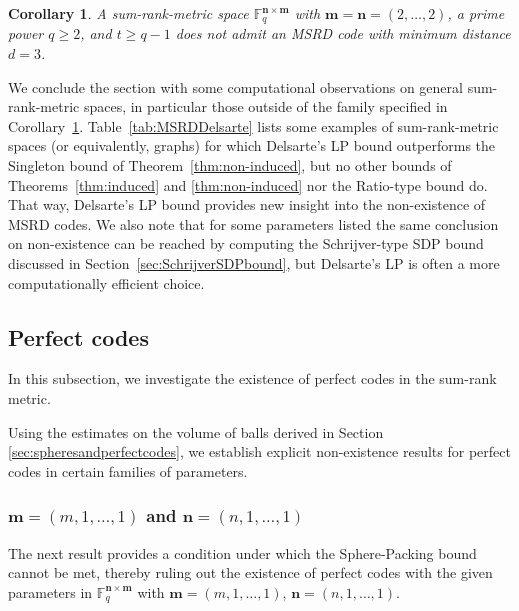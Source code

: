 \documentclass[a4paper]{article}
\newtheorem{corollary}[formula]{Corollary}
\newcommand{\F}{\mathbb{F}}
\newcommand{\bfn}{\mathbf {n}}
\newcommand{\bfm}{\mathbf {m}}
\newcommand{\spac}{\F^{\bfn\times\bfm}_q}
\begin{document}
\begin{corollary}\label{cor:noMSRD}
    A sum-rank-metric space $\spac$ with $\bfm=\bfn=(2,\dots,2)$, a prime power $q\geq2$, and $t\geq q-1$ does not admit an MSRD code with minimum distance $d=3$.
\end{corollary}

We conclude the section with some computational observations on general sum-rank-metric spaces, in particular those outside of the family specified in Corollary~\ref{cor:noMSRD}. Table~\ref{tab:MSRDDelsarte} lists some examples of sum-rank-metric spaces (or equivalently, graphs) for which Delsarte's LP bound outperforms the Singleton bound of Theorem~\ref{thm:non-induced}, but no other bounds of Theorems~\ref{thm:induced} and \ref{thm:non-induced} nor the Ratio-type bound do. That way, Delsarte's LP bound provides new insight into the non-existence of MSRD codes. We also note that for some parameters listed the same conclusion on non-existence can be reached by computing the Schrijver-type SDP bound discussed in Section~\ref{sec:SchrijverSDPbound}, but Delsarte's LP is often a more computationally efficient choice.

\subsection{Perfect codes}
In this subsection, we investigate the existence of perfect codes in the sum-rank metric. 

Using the estimates on the volume of balls derived in Section \ref{sec:spheresandperfectcodes}, we establish explicit non-existence results for perfect codes in certain families of parameters. 

\subsubsection{$\bfm=(m,1,\dots,1)$ and  $\bfn=(n,1,\dots,1)$}

The next result provides a condition under which the Sphere-Packing bound cannot be met, thereby ruling out the existence of perfect codes with the given parameters in $\spac$ with $\bfm=(m,1,\dots,1)$, $\bfn=(n,1,\dots,1)$.
\end{document}
